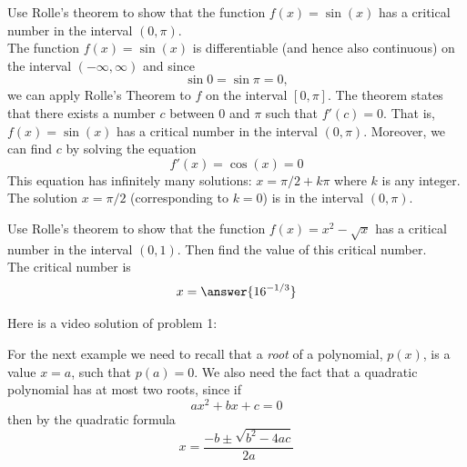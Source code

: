 \documentclass[handout]{ximera}
\begin{document}
\begin{example} [example 1] Use Rolle's theorem to show that the function $f(x) = \sin(x)$ has a critical number in the interval $(0, \pi)$.\\
The function $f(x) = \sin(x)$ is differentiable (and hence also continuous) on the interval $(-\infty, \infty)$ and since
\[
\sin 0 = \sin \pi = 0,
\]
we can apply Rolle's Theorem to $f$ on the interval $[0, \pi]$. The theorem states that there exists a number $c$ between $0$ and $\pi$ such that 
$f'(c) = 0$. That is, $f(x) = \sin(x)$ has a critical number in the interval $(0, \pi)$.
Moreover, we can find $c$ by solving the equation
\[
f'(x) = \cos(x) = 0
\]
This equation has infinitely many solutions: $x = \pi/2 + k\pi$ where $k$ is any integer.
The solution $x = \pi/2$ (corresponding to $k = 0$) is in the interval $(0, \pi)$.
\end{example}

\begin{problem} [problem 1] 
Use Rolle's theorem to show that the function $f(x) = x^2 - \sqrt x$ has a critical number in the interval $(0, 1)$.
Then find the value of this critical number.\\
The critical number is
\[ 
x = \answer{16^{-1/3}}
\]
\end{problem} 

Here is a video solution of problem 1:
\begin{foldable}
\end{foldable}

For the next example we need to recall that a {\it root} of a polynomial, $p(x)$, is a value $x = a$, such that $p(a) = 0$.
We also need the fact that a quadratic polynomial has at most two roots, since if
\[
ax^2 + bx + c = 0
\]
then by the quadratic formula
\[
x = \frac{-b \pm \sqrt{b^2 - 4ac}}{2a}
\]
\end{document}
